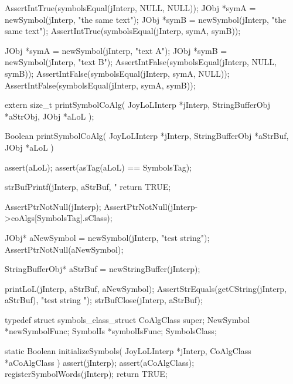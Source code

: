 
\startCTest
  AssertIntTrue(symbolsEqual(jInterp, NULL, NULL));
  JObj *symA = newSymbol(jInterp, "the same text");
  JObj *symB = newSymbol(jInterp, "the same text");
  AssertIntTrue(symbolsEqual(jInterp, symA, symB));
\stopCTest
\stopTestCase


\startCTest
  JObj *symA = newSymbol(jInterp, "text A");
  JObj *symB = newSymbol(jInterp, "text B");
  AssertIntFalse(symbolsEqual(jInterp, NULL, symB));
  AssertIntFalse(symbolsEqual(jInterp, symA, NULL));
  AssertIntFalse(symbolsEqual(jInterp, symA, symB));
\stopCTest
\stopTestCase
\stopTestSuite



\startCHeader
extern size_t printSymbolCoAlg(
  JoyLoLInterp    *jInterp,
  StringBufferObj *aStrObj,
  JObj        *aLoL
);
\stopCHeader
{}

\startCCode
Boolean printSymbolCoAlg(
  JoyLoLInterp    *jInterp,
  StringBufferObj *aStrBuf,
  JObj        *aLoL
) {
  assert(aLoL);
  assert(asTag(aLoL) == SymbolsTag);

  strBufPrintf(jInterp, aStrBuf, "%
  return TRUE;
}
\stopCCode


\startCTest
  AssertPtrNotNull(jInterp);
  AssertPtrNotNull(jInterp->coAlgs[SymbolsTag].sClass);

  JObj* aNewSymbol = newSymbol(jInterp, "test string");
  AssertPtrNotNull(aNewSymbol);
  
  StringBufferObj* aStrBuf = newStringBuffer(jInterp);
  
  printLoL(jInterp, aStrBuf, aNewSymbol);
  AssertStrEquals(getCString(jInterp, aStrBuf),
    "test string ");
  strBufClose(jInterp, aStrBuf);
\stopCTest
\stopTestCase
\stopTestSuite

\startTestSuite[registerSymbols]

\startCHeader
typedef struct symbols_class_struct {
  CoAlgClass  super;
  NewSymbol  *newSymbolFunc;
  SymbolIs   *symbolIsFunc;
} SymbolsClass;
\stopCHeader

\startCCode
static Boolean initializeSymbols(
  JoyLoLInterp *jInterp,
  CoAlgClass   *aCoAlgClass
) {
  assert(jInterp);
  assert(aCoAlgClass);
  registerSymbolWords(jInterp);
  return TRUE;
}
\stopCCode

